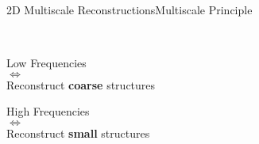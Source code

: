 \begin{frame}[noframenumbering]{2D Multiscale Reconstructions}{Multiscale Principle \cite{bunks}}
  \vspace{-0.4cm}
  \begin{multicols}{2}

    \begin{center}
    ~
    \vspace{0.8cm}

    Low Frequencies \\ $\Longleftrightarrow$ \\ Reconstruct \textbf{coarse} structures

    \vspace{2.4cm}

    High Frequencies \\ $\Longleftrightarrow$ \\ Reconstruct \textbf{small} structures
    \end{center}


\end{multicols}
\end{frame}
